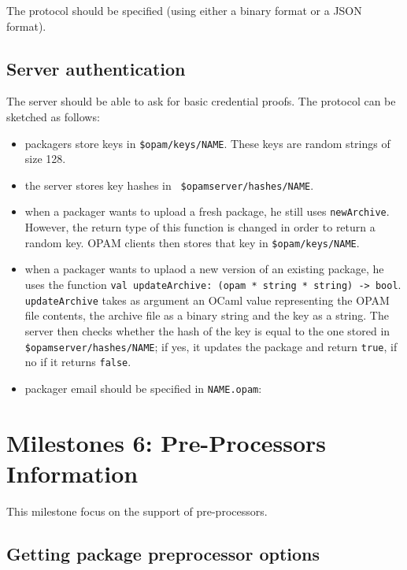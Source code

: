 \documentclass[a4paper,11pt]{article}
\begin{document}
The protocol should be specified (using either a binary format or a
JSON format).

\subsection{Server authentication}

The server should be able to ask for basic credential proofs. The
protocol can be sketched as follows:

\begin{itemize}

\item packagers store keys in {\tt \$opam/keys/NAME}. These keys are
  random strings of size 128.

\item the server stores key hashes in {\tt
  \$opamserver/hashes/NAME}.

\item when a packager wants to upload a fresh package, he still uses
  {\tt newArchive}. However, the return type of this function is
  changed in order to return a random key. OPAM clients then stores
  that key in {\tt \$opam/keys/NAME}.

\item when a packager wants to uplaod a new version of an existing
  package, he uses the function {\tt val updateArchive: (opam * string
    * string) -> bool}. {\tt updateArchive} takes as argument an OCaml
  value representing the OPAM file contents, the archive file as a
  binary string and the key as a string. The server then checks
  whether the hash of the key is equal to the one stored in {\tt
    \$opamserver/hashes/NAME}; if yes, it updates the
  package and return {\tt true}, if no if it returns {\tt false}.

\item packager email should be specified in {\tt NAME.opam}:

\end{itemize}

\section{Milestones 6: Pre-Processors Information}

This milestone focus on the support of pre-processors.

\subsection{Getting package preprocessor options}
\end{document}
